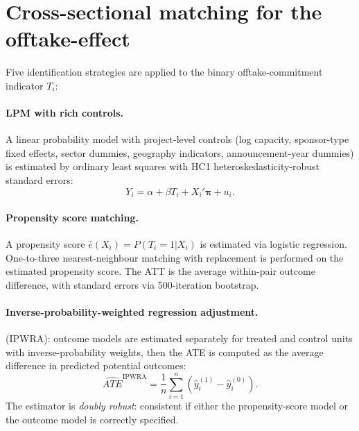 \section{Cross-sectional matching for the offtake-effect}
\label{sec:methods_offtake}

Five identification strategies are applied to the binary offtake-commitment indicator $T_i$:

\paragraph{LPM with rich controls.} A linear probability model with project-level controls (log capacity, sponsor-type fixed effects, sector dummies, geography indicators, announcement-year dummies) is estimated by ordinary least squares with HC1 heteroskedasticity-robust standard errors:
\begin{equation}
Y_i = \alpha + \beta T_i + X_i'\boldsymbol{\pi} + u_i.
\label{eq:methods_lpm}
\end{equation}

\paragraph{Propensity score matching.} A propensity score $\hat{e}(X_i) = P(T_i = 1 | X_i)$ is estimated via logistic regression. One-to-three nearest-neighbour matching with replacement is performed on the estimated propensity score. The ATT is the average within-pair outcome difference, with standard errors via 500-iteration bootstrap.

\paragraph{Inverse-probability-weighted regression adjustment.} \cite{robins2000marginal} (IPWRA): outcome models are estimated separately for treated and control units with inverse-probability weights, then the ATE is computed as the average difference in predicted potential outcomes:
\begin{equation}
\widehat{ATE}^{\text{IPWRA}} = \frac{1}{n} \sum_{i=1}^{n} \left( \hat{y}_i^{(1)} - \hat{y}_i^{(0)} \right).
\label{eq:methods_ipwra}
\end{equation}
The estimator is \emph{doubly robust}: consistent if either the propensity-score model or the outcome model is correctly specified.

